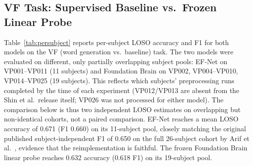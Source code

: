 \documentclass[journal]{IEEEtran}
\begin{document}
\subsection{VF Task: Supervised Baseline vs.\ Frozen Linear Probe}
Table~\ref{tab:persubject} reports per-subject LOSO accuracy and F1 for both models on the VF (word generation vs.\ baseline) task. The two models were evaluated on different, only partially overlapping subject pools: EF-Net on VP001--VP011 (11 subjects) and Foundation Brain on VP002, VP004--VP010, VP014--VP025 (19 subjects). This reflects which subjects' preprocessing runs completed by the time of each experiment (VP012/VP013 are absent from the Shin et al.\ release itself; VP026 was not processed for either model). The comparison below is thus two independent LOSO estimates on overlapping but non-identical cohorts, not a paired comparison. EF-Net reaches a mean LOSO accuracy of 0.671 (F1 0.660) on its 11-subject pool, closely matching the original published subject-independent F1 of 0.650 on the full 26-subject cohort by Arif et al.~\cite{arif2024}, evidence that the reimplementation is faithful. The frozen Foundation Brain linear probe reaches 0.632 accuracy (0.618 F1) on its 19-subject pool.
\end{document}
